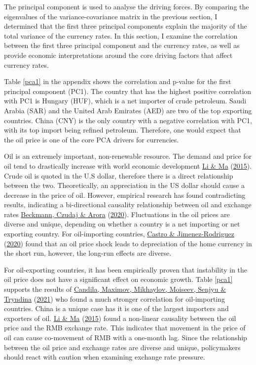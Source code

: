\documentclass[11pt,preprint, authoryear]{elsarticle}
\numberwithin{equation}{section}
\numberwithin{figure}{section}
\numberwithin{table}{section}
\begin{document}
The principal component is used to analyse the driving forces. By
comparing the eigenvalues of the variance-covariance matrix in the
previous section, I determined that the first three principal components
explain the majority of the total variance of the currency rates. In
this section, I examine the correlation between the first three
principal component and the currency rates, as well as provide economic
interpretations around the core driving factors that affect currency
rates.

Table \ref{pca1} in the appendix shows the correlation and p-value for
the first principal component (PC1). The country that has the highest
positive correlation with PC1 is Hungary (HUF), which is a net importer
of crude petroleum. Saudi Arabia (SAR) and the United Arab Emirates
(AED) are two of the top exporting countries. China (CNY) is the only
country with a negative correlation with PC1, with its top import being
refined petroleum. Therefore, one would expect that the oil price is one
of the core PCA drivers for currencies.

Oil is an extremely important, non-renewable resource. The demand and
price for oil tend to drastically increase with world economic
development \protect\hyperlink{ref-li2015}{Li \& Ma}
(\protect\hyperlink{ref-li2015}{2015}). Crude oil is quoted in the U.S
dollar, therefore there is a direct relationship between the two.
Theoretically, an appreciation in the US dollar should cause a decrease
in the price of oil. However, empirical research has found contradicting
results, indicating a bi-directional causality relationship between oil
and exchange rates \protect\hyperlink{ref-beck2020}{Beckmann, Czudaj \&
Arora} (\protect\hyperlink{ref-beck2020}{2020}). Fluctuations in the oil
prices are diverse and unique, depending on whether a country is a net
importing or net exporting country. For oil-importing countries,
\protect\hyperlink{ref-castro}{Castro \& Jimenez-Rodriguez}
(\protect\hyperlink{ref-castro}{2020}) found that an oil price shock
leads to depreciation of the home currency in the short run, however,
the long-run effects are diverse.

For oil-exporting countries, it has been empirically proven that
instability in the oil price does not have a significant effect on
economic growth. Table \ref{pca1} supports the results of
\protect\hyperlink{ref-can2021}{Candila, Maximov, Mikhaylov, Moiseev,
Senjyu \& Tryndina} (\protect\hyperlink{ref-can2021}{2021}) who found a
much stronger correlation for oil-importing countries. China is a unique
case has it is one of the largest importers and exporters of oil.
\protect\hyperlink{ref-li2015}{Li \& Ma}
(\protect\hyperlink{ref-li2015}{2015}) found a non-linear causality
between the oil price and the RMB exchange rate. This indicates that
movement in the price of oil can cause co-movement of RMB with a
one-month lag. Since the relationship between the oil price and exchange
rates are diverse and unique, policymakers should react with caution
when examining exchange rate pressure.
\end{document}
